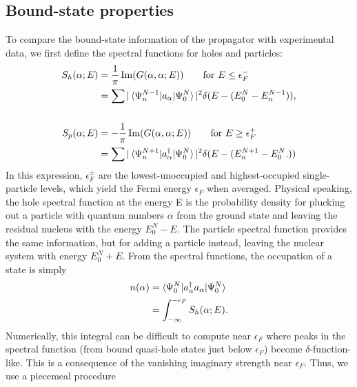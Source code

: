 \subsection{Bound-state properties}
To compare the bound-state information of the propagator with experimental data, we first
define the spectral functions for holes and particles:
\begin{equation}
    \begin{split}
        S_{h}(\alpha; E) & =
        \frac{1}{\pi}\operatorname{Im}({G(\alpha,\alpha;E)})\qquad \text{for } E\leq\epsilon_{F}^{-}\\
        & = \sum|\braket{\Psi^{N-1}_{n}|a_{\alpha}|\Psi^{N}_{0}}|^{2}
        \delta(E-(E^{N}_{0}-E_{n}^{N-1})),\\
        \\
        S_{p}(\alpha; E) & =
        -\frac{1}{\pi}\operatorname{Im}({G(\alpha,\alpha;E)})\qquad \text{for } E\geq\epsilon_{F}^{+}\\
        & = \sum|\braket{\Psi^{N+1}_{n}|a_{\alpha}^{\dagger}|\Psi^{N}_{0}}|^{2}
        \delta(E-(E_{n}^{N+1}-E^{N}_{0}.))
    \end{split}
\end{equation}
In this expression, $\epsilon_{F}^{\pm}$ are the lowest-unoccupied and highest-occupied
single-particle levels, which yield the Fermi energy $\epsilon_{F}$ when averaged. Physical
speaking, the hole spectral function at the energy E is the probability density for plucking out
a particle with quantum numbers $\alpha$ from the ground state and leaving the residual nucleus with the
energy $E^{N}_{0}-E$. The particle spectral function provides the same information, but for adding a
particle instead, leaving the nuclear system with energy $E^{N}_{0}+E$. From the spectral functions, the occupation of a state is simply
\begin{equation} \label{ParticleNumber}
    \begin{split}
        n(\alpha) & = \braket{\Psi^{N}_{0}|a_{\alpha}^{\dagger}a_{\alpha}|\Psi^{N}_{0}}\\
        & = \int_{-\infty}^{-\epsilon_{F}}S_{h}(\alpha; E).
    \end{split}
\end{equation}
Numerically, this integral can be difficult to compute near $\epsilon_{F}$ where peaks in the
spectral function (from bound quasi-hole states just below $\epsilon_{F}$) become $\delta$-function-like. 
This is a consequence of the vanishing imaginary strength near $\epsilon_{F}$. Thus, we use a piecemeal procedure
